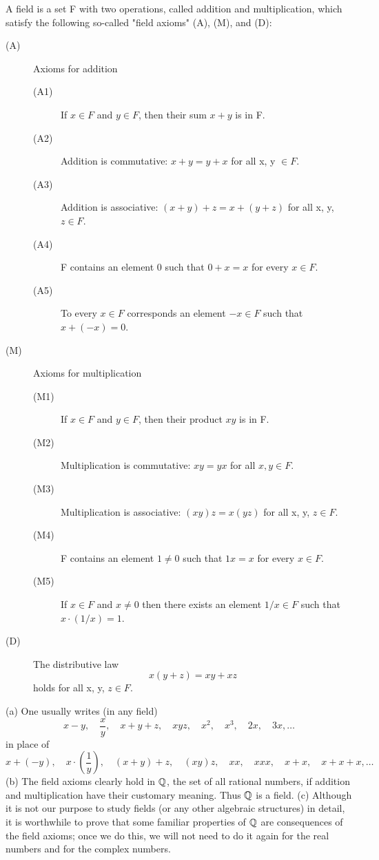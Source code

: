 \begin{definition} %
  \label{def:chap1:field_axioms}
  A field is a set F with two operations, called addition and
  multiplication, which satisfy the following so-called "field
  axioms" (A), (M), and (D):
  \begin{description}
    \item[(A)] Axioms for addition
      \begin{description}
        \item[(A1)] If $x \in F$ and $y \in F$, then their sum $x+y$ is in F.
        \item[(A2)] Addition is commutative: $x+y = y+x$ for all x, y $\in F$.
        \item[(A3)] Addition is associative: $(x+y)+z = x+(y+z)$ for
          all x, y, $z \in F$.
        \item[(A4)] F contains an element 0 such that $0+x = x$ for
          every $x \in F$.
        \item[(A5)] To every $x \in F$ corresponds an element $-x \in
          F$ such that $x+(-x) = 0$.
      \end{description}
    \item[(M)] Axioms for multiplication
      \begin{description}
        \item[(M1)] If $x \in F$ and $y \in F$, then their product $xy$ is in F.
        \item[(M2)] Multiplication is commutative: $xy = yx$ for all
          $x, y \in F$.
        \item[(M3)] Multiplication is associative: $(xy)z = x(yz)$
          for all x, y, $z \in F$.
        \item[(M4)] F contains an element $1 \ne 0$ such that $1x =
          x$ for every $x \in F$.
        \item[(M5)] If $x \in F$ and $x \ne 0$ then there exists an
          element $1/x \in F$ such that $x \cdot (1/x) = 1$.
      \end{description}
    \item[(D)] The distributive law
      \[ x(y+z) = xy + xz \]
      holds for all x, y, $z \in F$.
  \end{description}
\end{definition}

\begin{remark} %
  \label{rem:chap1:field_remarks}
  (a) One usually writes (in any field)
  \[ x-y, \quad \frac{x}{y}, \quad x+y+z, \quad xyz, \quad x^{2},
  \quad x^{3}, \quad 2x, \quad 3x, \dots \]
  in place of
  \[ x+(-y), \quad x \cdot (\frac{1}{y}), \quad (x+y)+z, \quad (xy)z,
  \quad xx, \quad xxx, \quad x+x, \quad x+x+x, \dots \]
  (b) The field axioms clearly hold in $\mathbb{Q}$, the set of all rational
  numbers, if addition and multiplication have their customary
  meaning. Thus $\mathbb{Q}$ is a field.
  (c) Although it is not our purpose to study fields (or any other
  algebraic structures) in detail, it is worthwhile to prove that
  some familiar properties of $\mathbb{Q}$ are consequences of the field
  axioms; once we do this, we will not need to do it again for the
  real numbers and for the complex numbers.
\end{remark}


